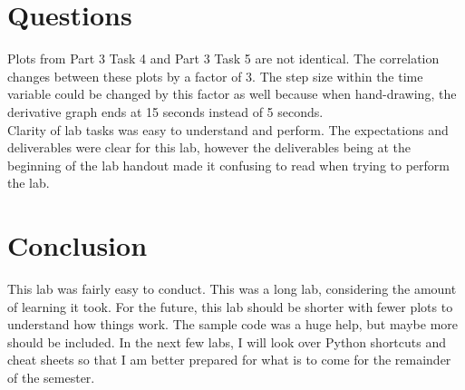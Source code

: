 \documentclass[12pt]{report}
\begin{document}
\section{Questions}
Plots from Part 3 Task 4 and Part 3 Task 5 are not identical. The correlation changes between these plots by a factor of 3. The step size within the time variable could be changed by this factor as well because when hand-drawing, the derivative graph ends at 15 seconds instead of 5 seconds. \\

\noindent Clarity of lab tasks was easy to understand and perform. The expectations and deliverables were clear for this lab, however the deliverables being at the beginning of the lab handout made it confusing to read when trying to perform the lab. 

\section{Conclusion}
This lab was fairly easy to conduct. This was a long lab, considering the amount of learning it took. For the future, this lab should be shorter with fewer plots to understand how things work. The sample code was a huge help, but maybe more should be included. In the next few labs, I will look over Python shortcuts and cheat sheets so that I am better prepared for what is to come for the remainder of the semester. 
\end{document}
